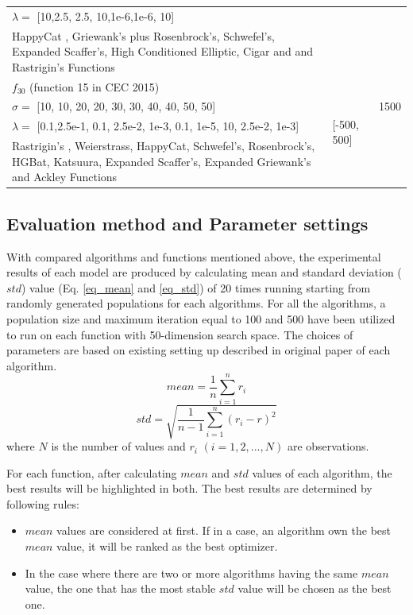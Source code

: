 \documentclass[a4paper,13pt,2p]{report}
\begin{document}
\begin{table}[!t]
\begin{tabular}{p{9cm} p{2cm} p{1cm}}
$\lambda = $  [10,2.5, 2.5, 10,1e-6,1e-6, 10] & \\
HappyCat , Griewank’s plus Rosenbrock’s, Schwefel's, Expanded Scaffer’s, High Conditioned Elliptic, Cigar and  and Rastrigin’s  Functions & \\ \hline
$f_{30}$ (function 15 in CEC 2015) & \multirow{4}{*}{[-500, 500]} & \multirow{3}{*}{1500} \\
$\sigma = $  [10, 10, 20, 20, 30, 30, 40, 40, 50, 50] & \\
$\lambda = $  [0.1,2.5e-1, 0.1, 2.5e-2, 1e-3, 0.1, 1e-5, 10, 2.5e-2, 1e-3] & \\
Rastrigin’s  , Weierstrass, HappyCat, Schwefel's, Rosenbrock's, HGBat, Katsuura, Expanded Scaffer’s, Expanded Griewank’s  and  Ackley  Functions & \\ \hline

\end{tabular}
\end{table}

\subsection{Evaluation method and Parameter settings}

	With compared algorithms and functions mentioned above, the experimental results of each model are produced by calculating mean and standard deviation ($std$) value (Eq. \ref{eq_mean} and \ref{eq_std}) of 20 times running starting from randomly generated populations for each algorithms. For all the algorithms, a population size and maximum iteration equal to 100 and 500 have been utilized to run on each function with 50-dimension search space. The choices  of parameters are based on existing setting up
described in original paper of each algorithm.
\begin{equation} \label{eq_mean}
mean = \frac{1}{n}\sum_{i=1}^n r_i
\end{equation}
\begin{equation}\label{eq_std}
std = \sqrt{\frac{1}{n-1}\sum_{i=1}^n(r_i - r)^2}
\end{equation}
where $N$ is the number of values and $r_i$ $(i = 1, 2, ..., N)$ are observations.
	
	For each function, after calculating $mean$ and $std$ values of each algorithm, the best results will be highlighted in both. The best results are determined by following rules:
\begin{itemize}
\item $mean$ values are considered at first. If in a case, an algorithm own the best $mean$ value, it will be ranked as the best optimizer.
\item In the case where there are two or more algorithms having the same $mean$ value, the one that has the most stable $std$ value will be chosen as the best one.
\end{itemize}
	
\end{document}
